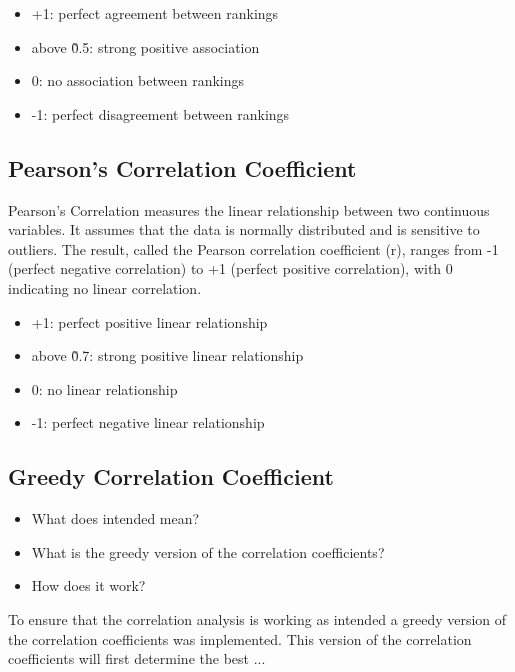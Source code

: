 \begin{itemize}
    \item +1: perfect agreement between rankings
    \item above \~ 0.5: strong positive association
    \item 0: no association between rankings
    \item -1: perfect disagreement between rankings
\end{itemize}

\subsection{Pearson's Correlation Coefficient}\label{pearsons-correlation-coefficient}

Pearson's Correlation measures the linear relationship between two continuous variables. It assumes that the data is normally distributed and is sensitive to outliers. The result, called the Pearson correlation coefficient (r), ranges from -1 (perfect negative correlation) to +1 (perfect positive correlation), with 0 indicating no linear correlation.

\begin{itemize}
    \item +1: perfect positive linear relationship
    \item above \~ 0.7: strong positive linear relationship
    \item 0: no linear relationship
    \item -1: perfect negative linear relationship
\end{itemize}

\subsection{Greedy Correlation Coefficient}\label{greedy-correlation-coefficient}

\begin{itemize}
    \item What does intended mean?
    \item What is the greedy version of the correlation coefficients?
    \item How does it work?
\end{itemize}

To ensure that the correlation analysis is working as intended a greedy version of the correlation coefficients was implemented. This version of the correlation coefficients will first determine the best ...

